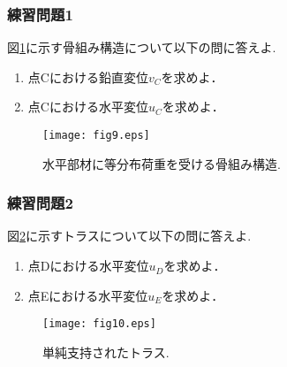 \documentclass[10pt,a4j]{jarticle}
\begin{document}
\subsubsection{練習問題1}
図\ref{fig:fig9}に示す骨組み構造について以下の問に答えよ. 
\begin{enumerate}
\item
	点Cにおける鉛直変位$v_C$を求めよ．
\item
	点Cにおける水平変位$u_C$を求めよ．
\end{enumerate}
\begin{figure}
	\begin{center}
	\texttt{[image: fig9.eps]} 
	\end{center}
	\caption{水平部材に等分布荷重を受ける骨組み構造.} 
	\label{fig:fig9}
\end{figure}
\subsubsection{練習問題2}
図\ref{fig:fig10}に示すトラスについて以下の問に答えよ. 
\begin{enumerate}
\item
	点Dにおける水平変位$u_D$を求めよ．
\item
	点Eにおける水平変位$u_E$を求めよ．
\end{enumerate}
\begin{figure}
	\begin{center}
	\texttt{[image: fig10.eps]} 
	\end{center}
	\caption{単純支持されたトラス.} 
	\label{fig:fig10}
\end{figure}
\end{document}
